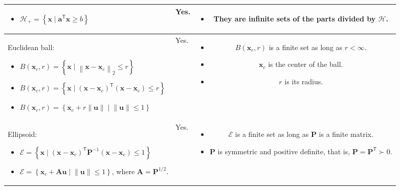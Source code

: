 \documentclass{article}
\newcommand{\trans}{\mathsf{T}}
\newcommand\norm[1]{\left\lVert#1\right\rVert}
\begin{document}
\begin{table}[ht!]
\begin{tabularx}{\textwidth}{|A|B|C|}
\begin{itemize}[leftmargin=*]
    \item \(\mathcal{H}_{+} = \left\{ \mathbf{x} \mid \mathbf{a}^\trans \mathbf{x} \geq b \right\}\)
\end{itemize} & Yes. & \vspace{-3.5ex}
\begin{itemize}[leftmargin=*]
    \item They are infinite sets of the parts divided by \(\mathcal{H}\).
\end{itemize}\\
\hline
Euclidean ball:
\begin{itemize}[leftmargin=*]
    \item \(B(\mathbf{x}_c, r) = \left\{ \mathbf{x} \mid \norm{\mathbf{x}-\mathbf{x}_c}_2 \leq r \right\}\)
    \item \(B(\mathbf{x}_c, r) = \left\{ \mathbf{x} \mid \left( \mathbf{x}-\mathbf{x}_c \right)^\trans \left( \mathbf{x}-\mathbf{x}_c \right) \leq r \right\}\)
    \item \(B(\mathbf{x}_c, r) = \left\{ \mathbf{x}_c + r \norm{\mathbf{u}} \mid \norm{\mathbf{u}} \leq 1 \right\}\)
\end{itemize} & Yes. & \vspace{-3.5ex}
\begin{itemize}[leftmargin=*]
    \item \(B(\mathbf{x}_c, r)\) is a finite set as long as \(r < \infty\).
    \item \(\mathbf{x}_c\) is the center of the ball.
    \item \(r\) is its radius.
\end{itemize}\\
\hline
Ellipsoid:
\begin{itemize}[leftmargin=*]
    \item \(\mathcal{E} = \left\{ \mathbf{x} \mid (\mathbf{x}-\mathbf{x}_c)^\trans\mathbf{P}^{-1}(\mathbf{x}-\mathbf{x}_c) \leq 1 \right\}\)
    \item \(\mathcal{E} = \left\{ \mathbf{x}_{c} + \mathbf{Au} \mid \norm{\mathbf{u}} \leq 1 \right\}\), where \(\mathbf{A} = \mathbf{P}^{1/2}\).
\end{itemize} & Yes. & \vspace{-3.5ex}
\begin{itemize}[leftmargin=*]
    \item \(\mathcal{E}\) is a finite set as long as \(\mathbf{P}\) is a finite matrix.
    \item \(\mathbf{P}\) is symmetric and positive definite, that is, \(\mathbf{P}=\mathbf{P}^\trans \succ 0\).

\end{itemize}
\end{tabularx}
\end{table}
\end{document}
